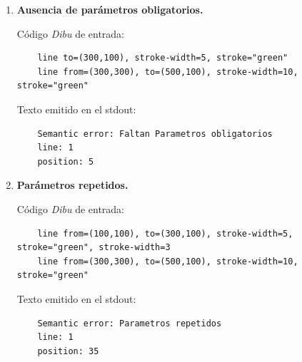 \begin{enumerate}
  \item \textbf{Ausencia de parámetros obligatorios.}

  Código \textit{Dibu} de entrada:

  \begin{lstlisting}
    line to=(300,100), stroke-width=5, stroke="green"
    line from=(300,300), to=(500,100), stroke-width=10, stroke="green"
  \end{lstlisting}

  Texto emitido en el stdout:

  \begin{lstlisting}
    Semantic error: Faltan Parametros obligatorios
    line: 1
    position: 5
  \end{lstlisting}

  \item \textbf{Parámetros repetidos.}

  Código \textit{Dibu} de entrada:

  \begin{lstlisting}
    line from=(100,100), to=(300,100), stroke-width=5, stroke="green", stroke-width=3
    line from=(300,300), to=(500,100), stroke-width=10, stroke="green"
  \end{lstlisting}

  Texto emitido en el stdout:

  \begin{lstlisting}
    Semantic error: Parametros repetidos
    line: 1
    position: 35
  \end{lstlisting}

\end{enumerate}
